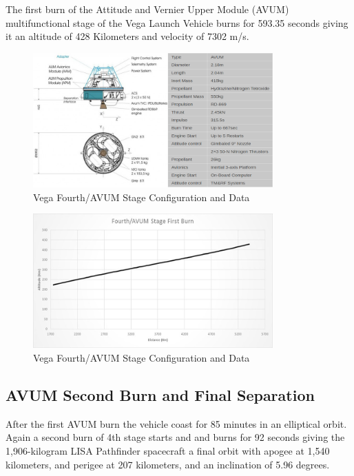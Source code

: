 \documentclass[11pt,fleqn]{book} %
\begin{document}
The first burn of the Attitude and Vernier Upper Module (AVUM) multifunctional stage of the Vega Launch Vehicle burns for 593.35 seconds giving it an altitude of 428 Kilometers and velocity of 7302 m/s. 
	
\begin{figure}[h]
    \centering
    \includegraphics[width=0.82\textwidth]{Stage4.png}
    \caption{Vega Fourth/AVUM Stage Configuration and Data}
    \label{fig:pca}
\end{figure}
\begin{figure}[h]
    \centering
    \includegraphics[width=0.82\textwidth]{Stage_4_Plot.jpg}
    \caption{Vega Fourth/AVUM Stage Configuration and Data}
    \label{fig:pca}
\end{figure}
\clearpage
\subsection{AVUM Second Burn and Final Separation}
After the first AVUM burn the vehicle coast for 85 minutes in an elliptical orbit. Again a second burn of 4th stage starts and and burns for 92 seconds giving the 1,906-kilogram LISA Pathfinder spacecraft a final orbit with apogee at 1,540 kilometers, and perigee at 207 kilometers, and an inclination of 5.96 degrees.
\end{document}
